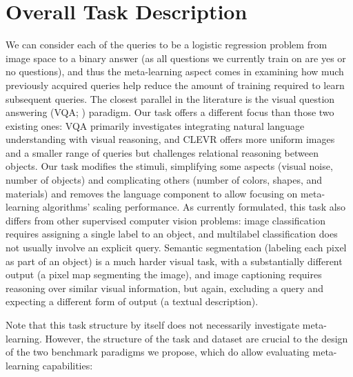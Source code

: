 \section{Overall Task Description}
We can consider each of the queries to be a logistic regression problem from image space to a binary answer (as all questions we currently train on are yes or no questions), and thus the meta-learning aspect comes in examining how much previously acquired queries help reduce the amount of training required to learn subsequent queries. The closest parallel in the literature is the visual question answering (VQA; \cite{Antol2015}) paradigm. Our task offers a different focus than those two existing ones: VQA primarily investigates integrating natural language understanding with visual reasoning, and CLEVR offers more uniform images and a smaller range of queries but challenges relational reasoning between objects. Our task modifies the stimuli, simplifying some aspects (visual noise, number of objects) and complicating others (number of colors, shapes, and materials) and removes the language component to allow focusing on meta-learning algorithms’ scaling performance. As currently formulated, this task also differs from other supervised computer vision problems: image classification requires assigning a single label to an object, and multilabel classification does not usually involve an explicit query. Semantic segmentation (labeling each pixel as part of an object) is a much harder visual task, with a substantially different output (a pixel map segmenting the image), and image captioning requires reasoning over similar visual information, but again, excluding a query and expecting a different form of output (a textual description).

Note that this task structure by itself does not necessarily investigate meta-learning. However, the structure of the task and dataset are crucial to the design of the two benchmark paradigms we propose, which do allow evaluating meta-learning capabilities:

